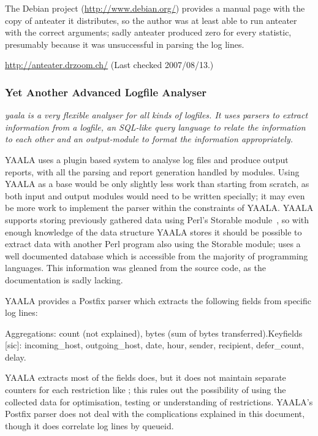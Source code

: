 The Debian project (\url{http://www.debian.org/}) provides a manual page
with the copy of anteater it distributes, so the author was at least able
to run anteater with the correct arguments; sadly anteater produced zero
for every statistic, presumably because it was unsuccessful in parsing the
log lines.

\url{http://anteater.drzoom.ch/} \newline (Last checked 2007/08/13.)

\subsubsection{Yet Another Advanced Logfile Analyser}

\textit{yaala is a very flexible analyser for all kinds of logfiles. It
uses parsers to extract information from a logfile, an SQL-like query
language to relate the information to each other and an output-module to
format the information appropriately.\/}

YAALA uses a plugin based system to analyse log files and produce \HTML{}
output reports, with all the parsing and report generation handled by
modules.  Using YAALA as a base would be only slightly less work than
starting from scratch, as both input and output modules would need to be
written specially; it may even be more work to implement the parser within
the constraints of YAALA\@.  YAALA supports storing previously gathered
data using Perl's Storable module~\cite{perl-storable}, so with enough
knowledge of the data structure YAALA stores it should be possible to
extract data with another Perl program also using the Storable module;
\parsername{} uses a well documented database which is accessible from the
majority of programming languages.  This information was gleaned from the
source code, as the documentation is sadly lacking.

YAALA provides a Postfix parser which extracts the following fields from
specific log lines:

\noindent\tab{}Aggregations: count (not explained), bytes (sum of bytes
transferred).\newline \tab{}Keyfields [sic]: incoming\_host,
outgoing\_host, date, hour, sender, recipient, defer\_count, delay.

YAALA extracts most of the fields \parsername{} does, but it does not
maintain separate counters for each restriction like \parsername{}; this
rules out the possibility of using the collected data for  optimisation,
testing or understanding of restrictions.  YAALA's Postfix parser does not
deal with the complications explained in this document, though it does
correlate log lines by queueid.

